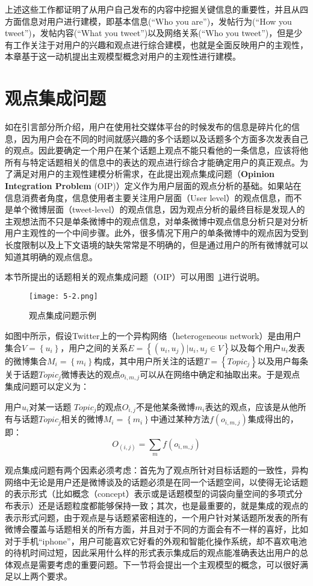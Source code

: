 上述这些工作都证明了从用户自己发布的内容中挖掘关键信息的重要性，并且从四方面信息对用户进行建模，即基本信息(“Who you are”)，发帖行为(“How
you tweet”)，发帖内容(“What you tweet”)以及网络关系(“Who you tweet”)，但是少有工作关注于对用户的兴趣和观点进行综合建模，也就是全面反映用户的主观性，本章基于这一动机提出主观模型概念对用户的主观性进行建模。

\section{观点集成问题}
\label{sec3}
如在引言部分所介绍，用户在使用社交媒体平台的时候发布的信息是碎片化的信息，因为用户会在不同的时间就感兴趣的多个话题以及话题多个方面多次发表自己的观点。因此要确定一个用户在某个话题上观点不能只看他的一条信息，应该将他所有与特定话题相关的信息中的表达的观点进行综合才能确定用户的真正观点。为了满足对用户的主观性建模分析需求，在此提出观点集成问题（\textbf{Opinion Integration Problem} (OIP)）定义作为用户层面的观点分析的基础。如果站在信息消费者角度，信息使用者主要关注用户层面（User level）的观点信息，而不是单个微博层面（tweet-level）的观点信息，因为观点分析的最终目标是发现人的主观想法而不只是单条微博中的观点信息，对单条微博中观点信息分析只是对分析用户主观性的一个中间步骤。此外，很多情况下用户的单条微博中的观点因为受到长度限制以及上下文语境的缺失常常是不明确的，但是通过用户的所有微博就可以知道其明确的观点信息。

本节所提出的话题相关的观点集成问题（OIP）可以用图~\ref{fig5-2}进行说明。
\begin{figure}[htb]
\centering
\texttt{[image: 5-2.png]}
\caption{观点集成问题示例}
\label{fig5-2}
\end{figure}
如图中所示，假设Twitter上的一个异构网络（heterogeneous network）是由用户集合$ V=\left\{ u_{i} \right\} $，用户之间的关系$ E=\left\{(u_{i},u_{j})| u_{i},u_{j} \in V\right\} $以及每个用户$ u_i $发表的微博集合$ M_{i}=\left\{ m_{i} \right\} $构成，其中用户所关注的话题$ T=\left\{ Topic_{j} \right\} $以及用户每条关于话题$ Topic_{j} $微博表达的观点$ o_{i,m,j} $可以从在网络中确定和抽取出来。于是观点集成问题可以定义为：
\begin{definition}[观点集成问题]
用户$ u_{i} $对某一话题 $ Topic_{j} $的观点$ O_{i,j} $不是他某条微博$ m_{i} $表达的观点，应该是从他所有与话题$ Topic_{j} $相关的微博$ M_{i}=\left\{ m_{i} \right\} $中通过某种方法$ f(o_{i,m,j}) $集成得出的，即：$$ O_(i,j)=\sum_mf(o_{i,m,j})$$
\end{definition}

观点集成问题有两个因素必须考虑：首先为了观点所针对目标话题的一致性，异构网络中无论是用户还是微博谈及的话题必须是在同一个话题空间，以使得无论话题的表示形式（比如概念（concept）表示或是话题模型的词袋向量空间的多项式分布表示）还是话题粒度都能够保持一致；其次，也是最重要的，就是集成的观点的表示形式问题，由于观点是与话题紧密相连的，一个用户针对某话题所发表的所有微博会覆盖与话题相关的所有方面，并且对于不同的方面会有不一样的喜好，比如对于手机“iphone”，用户可能喜欢它好看的外观和智能化操作系统，却不喜欢电池的待机时间过短，因此采用什么样的形式表示集成后的观点能准确表达出用户的总体观点是需要考虑的重要问题。下一节将会提出一个主观模型的概念，可以很好满足以上两个要求。

